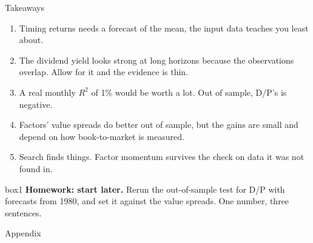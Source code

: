 \documentclass[aspectratio=169,10pt]{beamer}
\begin{document}
\begin{frame}{Takeaways}
\begin{enumerate}
\item Timing returns needs a forecast of the mean, the input data teaches you least about.
\vskip 4pt
\item The dividend yield looks strong at long horizons because the observations overlap. Allow for it and the evidence is thin.
\vskip 4pt
\item A real monthly $R^{2}$ of 1\% would be worth a lot. Out of sample, D/P's is negative.
\vskip 4pt
\item Factors' value spreads do better out of sample, but the gains are small and depend on how book-to-market is measured.
\vskip 4pt
\item Search finds things. Factor momentum survives the check on data it was not found in.
\end{enumerate}
\vskip 10pt
\begin{beamercolorbox}[rounded=true,sep=7pt]{box1}
\textbf{Homework: start later.} Rerun the out-of-sample test for D/P with forecasts from 1980, and set it against the value spreads. One number, three sentences.
\end{beamercolorbox}
\end{frame}

\appendix
\begin{frame}
\begin{center}
{\Large Appendix}
\end{center}
\end{frame}
\end{document}
